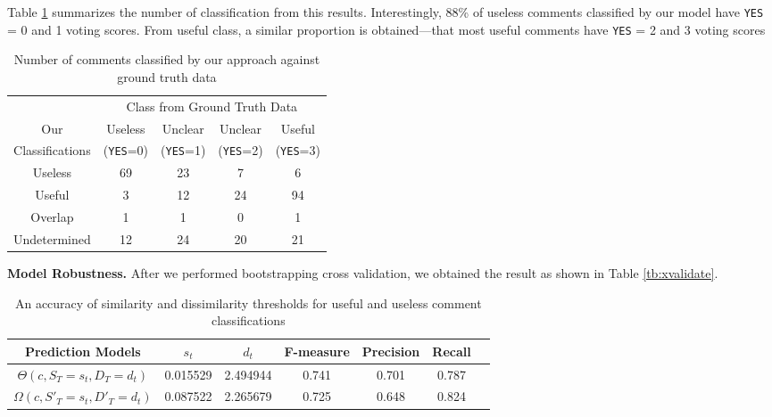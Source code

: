 Table \ref{tb:classify_number} summarizes the number of classification from this results.
Interestingly, 88\% of useless comments classified by our model have \texttt{YES} = 0 and 1 voting scores.
From useful class, a similar proportion is obtained---that most useful comments have \texttt{YES} = 2 and 3 voting scores

\begin{table}[h]
\centering
\small
\caption{Number of comments classified by our approach against ground truth data}
\begin{tabular}{ccccc}
\hline
& \multicolumn{4}{c}{Class from Ground Truth Data} \\ \cline{2-5}
Our&  Useless  & Unclear  & Unclear & Useful \\
Classifications&  (\texttt{YES}=0) & (\texttt{YES}=1) & (\texttt{YES}=2) & (\texttt{YES}=3) \\
\hline \hline
Useless & 69 & 23 & 7 & 6 \\
Useful & 3 & 12 & 24 & 94 \\
Overlap & 1 & 1 & 0 & 1 \\
Undetermined & 12 & 24 & 20 & 21 \\
\hline
\end{tabular}
\label{tb:classify_number}
\end{table}



\textbf{Model Robustness.} After we performed bootstrapping cross validation, we obtained the result as shown in Table \ref{tb:xvalidate}.

\newcommand{\SampleMean}{$\bar{x}$}
\newcommand{\SampleSD}{$s$}


\begin{table*}[!t]
\caption{An accuracy of similarity and dissimilarity thresholds for useful and useless comment classifications}
\small
\centering
\def\arraystretch{1.2}
\begin{tabular}{ccccccc}
\hline
Prediction Models & $s_t$ & $d_t$ & F-measure & Precision & Recall \\ \hline \hline
$\Theta(c,S_T=s_t,D_T=d_t)$   & 0.015529 & 2.494944 & 0.741 & 0.701 & 0.787 \\ \hline
$\Omega(c,S'_T=s_t,D'_T=d_t)$ & 0.087522 & 2.265679 & 0.725 & 0.648 & 0.824 \\ \hline
\end{tabular}
\label{tb:thresholds}
\end{table*}

